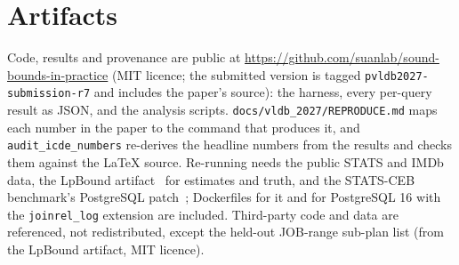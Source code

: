 \documentclass[sigconf, nonacm]{acmart}
\begin{document}
\section*{Artifacts}
Code, results and provenance are public at
\url{https://github.com/suanlab/sound-bounds-in-practice} (MIT licence; the
submitted version is tagged \texttt{pvldb2027-submission-r7} and includes
the paper's source): the harness, every per-query result as JSON, and the
analysis scripts.
\texttt{docs/vldb\_2027/REPRODUCE.md} maps each number in the paper to the
command that produces it, and \texttt{audit\_icde\_numbers} re-derives the headline numbers
from the results and checks them against the \LaTeX{} source. Re-running needs
the public STATS and IMDb data, the LpBound artifact~\cite{zhang2025lpbound}
for estimates and truth, and the STATS-CEB benchmark's PostgreSQL
patch~\cite{han2021cardest}; Dockerfiles for it and for PostgreSQL 16 with
the \texttt{joinrel\_log} extension are included. Third-party code and data are referenced, not redistributed, except
the held-out JOB-range sub-plan list (from the LpBound artifact, MIT licence).



\end{document}
